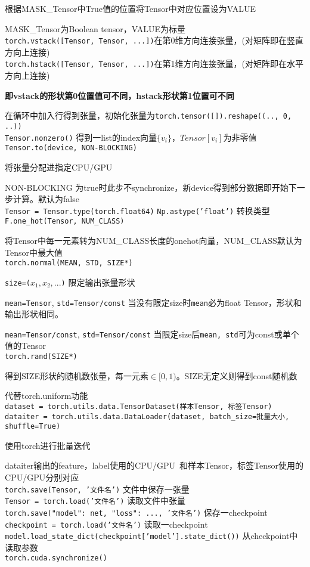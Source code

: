 \documentclass[UTF8]{ctexart}
\begin{document}
  根据MASK\_Tensor中True值的位置将Tensor中对应位置设为VALUE

  MASK\_Tensor为Boolean tensor，VALUE为标量\\
\texttt{torch.vstack([Tensor, Tensor, ...])}在第0维方向连接张量，(对矩阵即在竖直方向上连接)\\
\texttt{torch.hstack([Tensor, Tensor, ...])}在第1维方向连接张量，(对矩阵即在水平方向上连接)

  \textbf{即vstack的形状第0位置值可不同，hstack形状第1位置可不同}

  在循环中加入行得到张量，初始化张量为\texttt{torch.tensor([]).reshape((.., 0, ..))}\\
\texttt{Tensor.nonzero()} 得到一list的index向量$\{v_i\}$，$Tensor[v_i]$为非零值\\
\texttt{Tensor.to(device, NON-BLOCKING)} 

  将张量分配进指定CPU/GPU
  
  NON-BLOCKING 为true时此步不synchronize，新device得到部分数据即开始下一步计算。默认为false\\
\texttt{Tensor = Tensor.type(torch.float64)} \texttt{Np.astype('float')} 转换类型\\
\texttt{F.one\_hot(Tensor, NUM\_CLASS)} 

  将Tensor中每一元素转为NUM\_CLASS长度的onehot向量，NUM\_CLASS默认为Tensor中最大值\\
\texttt{torch.normal(MEAN, STD, SIZE*)}

  \texttt{size=($x_1, x_2, ...$)} 限定输出张量形状

  \texttt{mean=Tensor}, \texttt{std=Tensor/const} 当没有限定size时\texttt{mean}必为float Tensor，形状和输出形状相同。

  \texttt{mean=Tensor/const}, \texttt{std=Tensor/const} 当限定size后\texttt{mean, std}可为const或单个值的Tensor\\
\texttt{torch.rand(SIZE*)}

  得到SIZE形状的随机数张量，每一元素$\in [0,1)$。SIZE无定义则得到const随机数

  代替torch.uniform功能\\
\texttt{dataset = torch.utils.data.TensorDataset(样本Tensor, 标签Tensor)}\\
\texttt{dataiter = torch.utils.data.DataLoader(dataset, batch\_size=批量大小, shuffle=True)}

  使用torch进行批量迭代
  
  dataiter输出的feature，label使用的CPU/GPU\ 和样本Tensor，标签Tensor使用的CPU/GPU分别对应\\
\texttt{torch.save(Tensor, '文件名')} 文件中保存一张量\\
\texttt{Tensor = torch.load('文件名')} 读取文件中张量\\
\texttt{torch.save({"model": net, "loss": ...}, '文件名')} 保存一checkpoint\\
\texttt{checkpoint = torch.load('文件名')} 读取一checkpoint\\
\texttt{model.load\_state\_dict(checkpoint['model'].state\_dict())} 从checkpoint中读取参数\\
\texttt{torch.cuda.synchronize()} 
\end{document}
